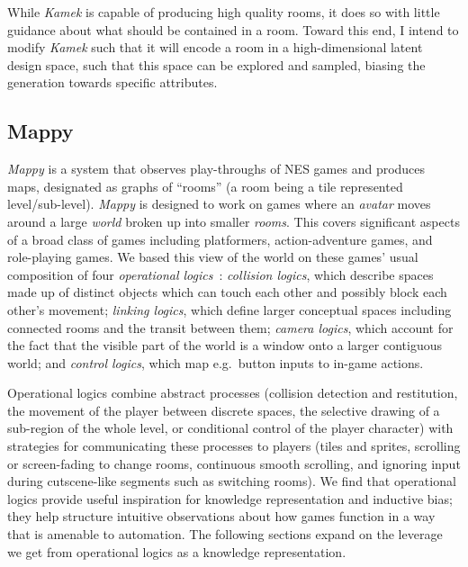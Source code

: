 \documentclass[12pt]{report}
\begin{document}
While \textit{Kamek} is capable of producing high quality rooms, it does so with little guidance about what should be contained in a room. Toward this end, I intend to modify \textit{Kamek} such that it will encode a room in a high-dimensional latent design space, such that this space can be explored and sampled, biasing the generation towards specific attributes.

\subsection*{Mappy}


\emph{Mappy} is a system that observes play-throughs of NES games and produces maps, designated as graphs of ``rooms'' (a room being a tile represented level/sub-level).  \emph{Mappy} is designed to work on games where an \emph{avatar} moves around a large \emph{world} broken up into smaller \emph{rooms}.
This covers significant aspects of a broad class of games including platformers, action-adventure games, and role-playing games.
We based this view of the world on these games' usual composition of four \emph{operational logics}~\cite{wardrip-fruin2005playable,osborn2017refining}: \emph{collision logics}, which describe spaces made up of distinct objects which can touch each other and possibly block each other's movement; \emph{linking logics}, which define larger conceptual spaces including connected rooms and the transit between them; \emph{camera logics}, which account for the fact that the visible part of the world is a window onto a larger contiguous world; and \emph{control logics}, which map e.g.\ button inputs to in-game actions.

Operational logics combine abstract processes (collision detection and restitution, the movement of the player between discrete spaces, the selective drawing of a sub-region of the whole level, or conditional control of the player character) with strategies for communicating these processes to players (tiles and sprites, scrolling or screen-fading to change rooms, continuous smooth scrolling, and ignoring input during cutscene-like segments such as switching rooms).
We find that operational logics provide useful inspiration for knowledge representation and inductive bias; they help structure intuitive observations about how games function in a way that is amenable to automation.
The following sections expand on the leverage we get from operational logics as a knowledge representation.
\end{document}
